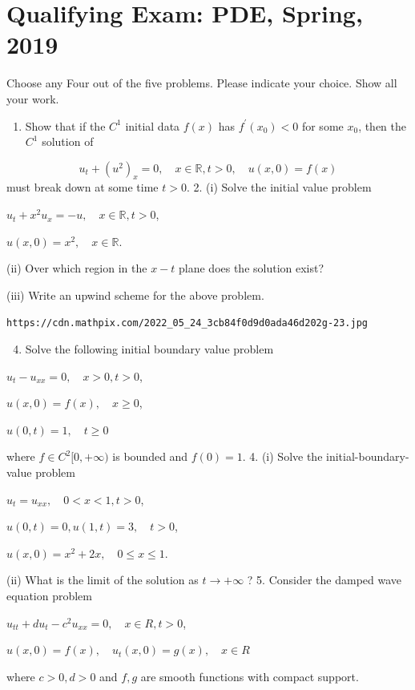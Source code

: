 \documentclass[10pt]{article}
\begin{document}
\section{Qualifying Exam: PDE, Spring, 2019}
Choose any Four out of the five problems. Please indicate your choice. Show all your work.

\begin{enumerate}
  \item Show that if the $C^{1}$ initial data $f(x)$ has $f^{\prime}\left(x_{0}\right)<0$ for some $x_{0}$, then the $C^{1}$ solution of
\end{enumerate}
$$
u_{t}+\left(u^{2}\right)_{x}=0, \quad x \in \mathbb{R}, t>0, \quad u(x, 0)=f(x)
$$
must break down at some time $t>0$. 2. (i) Solve the initial value problem

$u_{t}+x^{2} u_{x}=-u, \quad x \in \mathbb{R}, t>0$,

$u(x, 0)=x^{2}, \quad x \in \mathbb{R} .$

(ii) Over which region in the $x-t$ plane does the solution exist?

(iii) Write an upwind scheme for the above problem.

\texttt{https://cdn.mathpix.com/2022_05_24_3cb84f0d9d0ada46d202g-23.jpg}

\begin{enumerate}
  \setcounter{enumi}{3}
  \item Solve the following initial boundary value problem
\end{enumerate}
$u_{t}-u_{x x}=0, \quad x>0, t>0$,

$u(x, 0)=f(x), \quad x \geq 0$,

$u(0, t)=1, \quad t \geq 0$

where $f \in C^{2}[0,+\infty)$ is bounded and $f(0)=1$. 4. (i) Solve the initial-boundary-value problem

$u_{t}=u_{x x}, \quad 0<x<1, t>0$,

$u(0, t)=0, u(1, t)=3, \quad t>0$,

$u(x, 0)=x^{2}+2 x, \quad 0 \leq x \leq 1 .$

(ii) What is the limit of the solution as $t \rightarrow+\infty$ ? 5. Consider the damped wave equation problem

$u_{t t}+d u_{t}-c^{2} u_{x x}=0, \quad x \in R, t>0$,

$u(x, 0)=f(x), \quad u_{t}(x, 0)=g(x), \quad x \in R$

where $c>0, d>0$ and $f, g$ are smooth functions with compact support.
\end{document}
